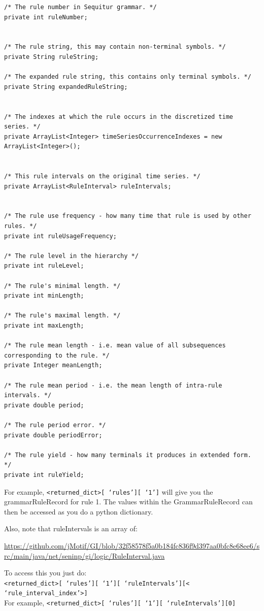 \documentclass[titlepage, letterpaper, 12pt]{article}
\def\bsq#1{%
	\lq{#1}\rq}
\begin{document}
\begin{lstlisting}
/* The rule number in Sequitur grammar. */
private int ruleNumber;


/* The rule string, this may contain non-terminal symbols. */
private String ruleString;

/* The expanded rule string, this contains only terminal symbols. */
private String expandedRuleString;


/* The indexes at which the rule occurs in the discretized time series. */
private ArrayList<Integer> timeSeriesOccurrenceIndexes = new ArrayList<Integer>();


/* This rule intervals on the original time series. */
private ArrayList<RuleInterval> ruleIntervals;


/* The rule use frequency - how many time that rule is used by other rules. */
private int ruleUsageFrequency;

/* The rule level in the hierarchy */
private int ruleLevel;

/* The rule's minimal length. */
private int minLength;

/* The rule's maximal length. */
private int maxLength;

/* The rule mean length - i.e. mean value of all subsequences corresponding to the rule. */
private Integer meanLength;

/* The rule mean period - i.e. the mean length of intra-rule intervals. */
private double period;

/* The rule period error. */
private double periodError;

/* The rule yield - how many terminals it produces in extended form. */
private int ruleYield;
\end{lstlisting}

For example, \texttt{<returned\_dict>[\bsq{rules}][\bsq{1}]} will give you the grammarRuleRecord for rule 1.  The values within the GrammarRuleRecord can then be accessed as you do a python dictionary.

Also, note that ruleIntervals is an array of:

\small{\url{https://github.com/jMotif/GI/blob/32f58578f5a0b184fc836f9d397aa0bfc8e68ee6/src/main/java/net/seninp/gi/logic/RuleInterval.java}}

To access this you just do:\\
\texttt{<returned\_dict>[\bsq{rules}][\bsq{1}][\bsq{ruleIntervals}][<\bsq{rule\_interval\_index}>]}\\
For example,
\texttt{<returned\_dict>[\bsq{rules}][\bsq{1}][\bsq{ruleIntervals}][0]}
\end{document}
